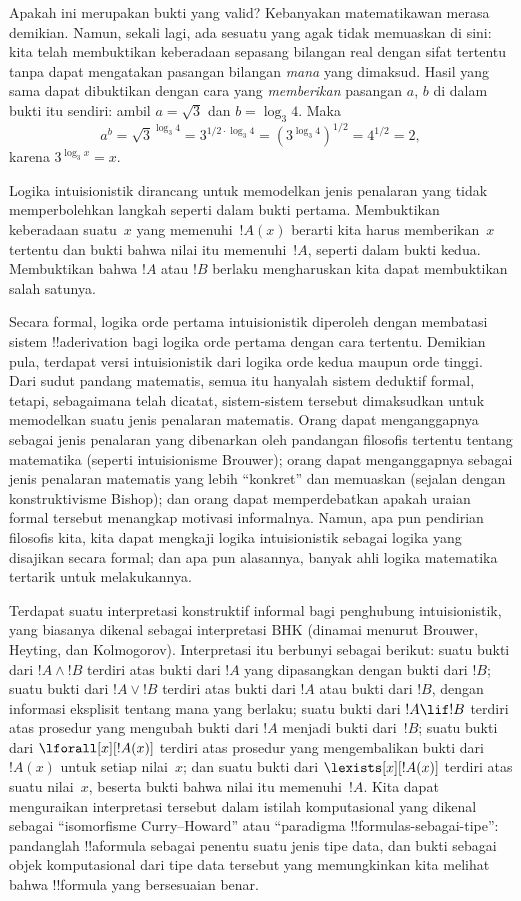 \documentclass[../../../include/open-logic-section]{subfiles}
\begin{document}
Apakah ini merupakan bukti yang valid? Kebanyakan matematikawan merasa
demikian. Namun, sekali lagi, ada sesuatu yang agak tidak memuaskan di sini:
kita telah membuktikan keberadaan sepasang bilangan real dengan sifat tertentu
tanpa dapat mengatakan pasangan bilangan \emph{mana} yang dimaksud. Hasil yang
sama dapat dibuktikan dengan cara yang \emph{memberikan} pasangan $a$, $b$ di dalam
bukti itu sendiri: ambil $a = \sqrt{3}$ dan $b = \log_3 4$. Maka
\[
a^b = \sqrt{3}^{\log_3 4} = 3^{1/2 \cdot \log_3 4} = (3^{\log_3
  4})^{1/2} = 4^{1/2}= 2,
\]
karena $3^{\log_3 x} = x$.

Logika intuisionistik dirancang untuk memodelkan jenis penalaran yang tidak
memperbolehkan langkah seperti dalam bukti pertama. Membuktikan keberadaan
suatu~$x$ yang memenuhi~$!A(x)$ berarti kita harus memberikan~$x$ tertentu
dan bukti bahwa nilai itu memenuhi~$!A$, seperti dalam bukti kedua. Membuktikan
bahwa $!A$ atau $!B$ berlaku mengharuskan kita dapat membuktikan salah satunya.

Secara formal, logika orde pertama intuisionistik diperoleh dengan membatasi
sistem !!a{derivation} bagi logika orde pertama dengan cara tertentu. Demikian
pula, terdapat versi intuisionistik dari logika orde kedua maupun orde tinggi.
Dari sudut pandang matematis, semua itu hanyalah sistem deduktif formal,
tetapi, sebagaimana telah dicatat, sistem-sistem tersebut dimaksudkan untuk
memodelkan suatu jenis penalaran matematis. Orang dapat menganggapnya sebagai
jenis penalaran yang dibenarkan oleh pandangan filosofis tertentu tentang
matematika (seperti intuisionisme Brouwer); orang dapat menganggapnya sebagai
jenis penalaran matematis yang lebih ``konkret'' dan memuaskan (sejalan dengan
konstruktivisme Bishop); dan orang dapat memperdebatkan apakah uraian formal
tersebut menangkap motivasi informalnya. Namun, apa pun pendirian filosofis
kita, kita dapat mengkaji logika intuisionistik sebagai logika yang disajikan
secara formal; dan apa pun alasannya, banyak ahli logika matematika tertarik
untuk melakukannya.

Terdapat suatu interpretasi konstruktif informal bagi penghubung
intuisionistik, yang biasanya dikenal sebagai interpretasi BHK (dinamai
menurut Brouwer, Heyting, dan Kolmogorov). Interpretasi itu berbunyi sebagai
berikut: suatu bukti dari $!A \land !B$ terdiri atas bukti dari $!A$ yang
dipasangkan dengan bukti dari $!B$; suatu bukti dari $!A \lor !B$ terdiri atas
bukti dari $!A$ atau bukti dari $!B$, dengan informasi eksplisit tentang mana
yang berlaku; suatu bukti dari $!A \lif !B$ terdiri atas prosedur yang
mengubah bukti dari $!A$ menjadi bukti dari~$!B$; suatu bukti dari
$\lforall[x][!A(x)]$ terdiri atas prosedur yang mengembalikan bukti dari
$!A(x)$ untuk setiap nilai~$x$; dan suatu bukti dari $\lexists[x][!A(x)]$
terdiri atas suatu nilai~$x$, beserta bukti bahwa nilai itu memenuhi~$!A$.
Kita dapat menguraikan interpretasi tersebut dalam istilah komputasional yang
dikenal sebagai ``isomorfisme Curry--Howard'' atau ``paradigma
!!{formula}s-sebagai-tipe'': pandanglah !!a{formula} sebagai penentu suatu
jenis tipe data, dan bukti sebagai objek komputasional dari tipe data tersebut
yang memungkinkan kita melihat bahwa !!{formula} yang bersesuaian benar.
\end{document}
